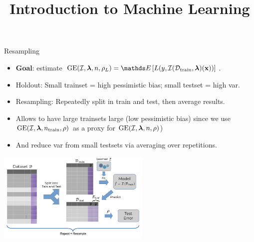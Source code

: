 \documentclass[11pt,compress,t,notes=noshow, xcolor=table]{beamer}
\title{Introduction to Machine Learning}
\institute{\href{https://compstat-lmu.github.io/lecture_i2ml/}{compstat-lmu.github.io/lecture\_i2ml}}
\date{}
\begin{document}
\sloppy


\begin{vbframe}{Resampling}

\begin{footnotesize}
\begin{itemize}
  \item \textbf{Goal}: estimate $\GE(\ind, \lamv, n, \rho_L) = \E 
  \left[L(y, \Itrainlam(\xv)) \right]$.
  \item Holdout: 
      Small trainset = high pessimistic bias; small testset = high var.
   \item Resampling: Repeatedly split in train and test, then average results.
  \item Allows to have large trainsets large (low pessimistic bias) since we use 
  $\GEfull$ as a proxy for $\GEfull[n]$)
\item And reduce var from small testsets via averaging over repetitions.
\end{itemize}
\end{footnotesize}

\begin{center}
\includegraphics[width=0.55\textwidth]{figure_man/resampling_error.pdf}
\end{center}

\end{vbframe}

\end{document}
